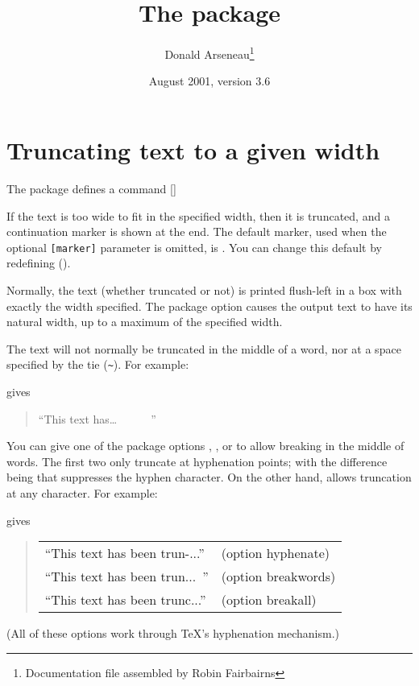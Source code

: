 \documentclass[a4paper]{article}
\begin{document}
\title{The  package}
\author{Donald Arseneau\thanks{Documentation file assembled by Robin
    Fairbairns}}
\date{August 2001, version 3.6}
\maketitle

\section*{Truncating text to a given width}

The package defines a command
[]{}{}

If the text is too wide to fit in the specified width, then it is
truncated, and a continuation marker is shown at the end.  The default
marker, used when the optional \texttt{[marker]} parameter is omitted,
is \cs{,}.   You can change this default by redefining
().

Normally, the text (whether truncated or not) is printed flush-left
in a box with exactly the width specified.  The package option
\option[fit] causes the output text to have its natural width, up to a
maximum of the specified width.

The text will not normally be truncated in the middle of a word,
nor at a space specified by the tie (\verb|~|).  For example:
\begin{quote}
\end{quote}
gives
\begin{quote}
  ``This text has\dots~~~~~~''
\end{quote}

You can give one of the package options \option[hyphenate],
\option[breakwords], or \option[breakall] to allow breaking in the
middle of words.  The first two only truncate at hyphenation points;
with the difference being that \option[breakwords] suppresses the
hyphen character.  On the other hand,  allows
truncation at any character.  For example:
\begin{quote}
\end{quote}
gives
\begin{quote}
  \begin{tabular}{l@{\quad}l}
    ``This text has been trun-...''  & (option hyphenate) \\
    ``This text has been trun...~''  & (option breakwords) \\
    ``This text has been trunc...''  & (option breakall)
  \end{tabular}
\end{quote}
(All of these options work through \TeX{}'s hyphenation mechanism.)
\end{document}
